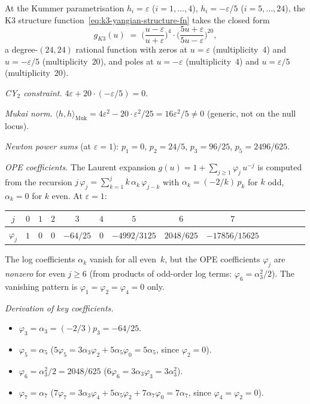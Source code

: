 \begin{proposition}
\label{prop:k3-kummer-structure-function}
\ClaimStatusProvedHere
At the Kummer parametrisation
$h_i = \varepsilon$ ($i = 1, \ldots, 4$),
$h_i = -\varepsilon/5$ ($i = 5, \ldots, 24$),
the K3 structure function~\eqref{eq:k3-yangian-structure-fn}
takes the closed form
\begin{equation}\label{eq:k3-explicit-g}
  g_{K3}(u) \;=\;
  \biggl(\frac{u - \varepsilon}{u + \varepsilon}\biggr)^{\!4}
  \cdot
  \biggl(\frac{5u + \varepsilon}{5u - \varepsilon}\biggr)^{\!20},
\end{equation}
a degree-$(24,24)$ rational function with zeros at
$u = \varepsilon$ (multiplicity~$4$) and $u = -\varepsilon/5$
(multiplicity~$20$), and poles at $u = -\varepsilon$ (multiplicity~$4$)
and $u = \varepsilon/5$ (multiplicity~$20$).

\emph{CY$_2$ constraint.}
$4\varepsilon + 20 \cdot (-\varepsilon/5) = 0$.

\emph{Mukai norm.}
$\langle h, h \rangle_{\mathrm{Muk}}
= 4\varepsilon^2 - 20 \cdot \varepsilon^2/25
= 16\varepsilon^2/5 \neq 0$
(generic, not on the null locus).

\emph{Newton power sums} (at $\varepsilon = 1$):
$p_1 = 0$, $p_2 = 24/5$, $p_3 = 96/25$, $p_5 = 2496/625$.

\emph{OPE coefficients.}
The Laurent expansion $g(u) = 1 + \sum_{j \geq 1} \varphi_j\, u^{-j}$
is computed from the recursion
$j\, \varphi_j = \sum_{k=1}^{j} k\, \alpha_k\, \varphi_{j-k}$
with $\alpha_k = (-2/k)\, p_k$ for $k$ odd, $\alpha_k = 0$ for $k$ even.
At $\varepsilon = 1$:
\begin{center}
\renewcommand{\arraystretch}{1.3}
\begin{tabular}{c|ccccccccccccc}
$j$ & $0$ & $1$ & $2$ & $3$ & $4$ & $5$ & $6$ & $7$ \\
\hline
$\varphi_j$ & $1$ & $0$ & $0$ & $-64/25$ & $0$ &
$-4992/3125$ & $2048/625$ & $-17856/15625$
\end{tabular}
\end{center}
The log coefficients $\alpha_k$ vanish for all even~$k$, but
the OPE coefficients $\varphi_j$ are \emph{nonzero} for even $j \geq 6$
(from products of odd-order log terms: $\varphi_6 = \alpha_3^2/2$).
The vanishing pattern is $\varphi_1 = \varphi_2 = \varphi_4 = 0$
only.

\emph{Derivation of key coefficients.}
\begin{itemize}
  \item $\varphi_3 = \alpha_3 = (-2/3) p_3 = -64/25$.
  \item $\varphi_5 = \alpha_5$\quad
    ($5\varphi_5 = 3\alpha_3 \varphi_2 + 5\alpha_5 \varphi_0
    = 5\alpha_5$, since $\varphi_2 = 0$).
  \item $\varphi_6 = \alpha_3^2/2 = 2048/625$\quad
    ($6\varphi_6 = 3\alpha_3 \varphi_3 = 3\alpha_3^2$).
  \item $\varphi_7 = \alpha_7$\quad
    ($7\varphi_7 = 3\alpha_3 \varphi_4 + 5\alpha_5 \varphi_2
    + 7\alpha_7 \varphi_0 = 7\alpha_7$, since $\varphi_4 = \varphi_2 = 0$).
\end{itemize}
\end{proposition}

